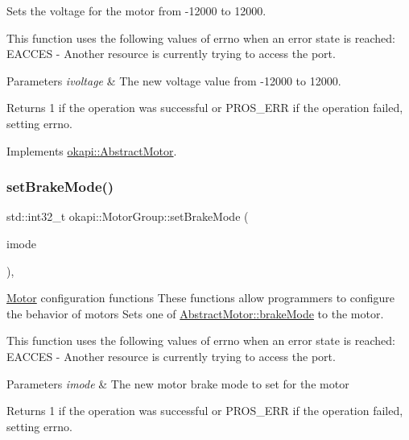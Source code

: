 Sets the voltage for the motor from -\/12000 to 12000.

This function uses the following values of errno when an error state is reached\+: E\+A\+C\+C\+ES -\/ Another resource is currently trying to access the port.


\begin{DoxyParams}{Parameters}
{\em ivoltage} & The new voltage value from -\/12000 to 12000. \\
\hline
\end{DoxyParams}
\begin{DoxyReturn}{Returns}
1 if the operation was successful or {\ttfamily P\+R\+O\+S\+\_\+\+E\+RR} if the operation failed, setting errno. 
\end{DoxyReturn}


Implements \mbox{\hyperlink{classokapi_1_1AbstractMotor_a15d12555f527109b046c65fe753d7e20}{okapi\+::\+Abstract\+Motor}}.

\mbox{\label{classokapi_1_1MotorGroup_a2124ee76893c401cd6dbf4879808349a}} 
\subsubsection{\texorpdfstring{setBrakeMode()}{setBrakeMode()}}
{\footnotesize\ttfamily std\+::int32\+\_\+t okapi\+::\+Motor\+Group\+::set\+Brake\+Mode (\begin{DoxyParamCaption}\item[{\mbox{\hyperlink{classokapi_1_1AbstractMotor_a132e0485dbb59a60c3f934338d8fa601}{Abstract\+Motor\+::brake\+Mode}}}]{imode }\end{DoxyParamCaption})\hspace{0.3cm}{\ttfamily [override]}, {\ttfamily [virtual]}}

\mbox{\hyperlink{classokapi_1_1Motor}{Motor}} configuration functions These functions allow programmers to configure the behavior of motors Sets one of \mbox{\hyperlink{classokapi_1_1AbstractMotor_a132e0485dbb59a60c3f934338d8fa601}{Abstract\+Motor\+::brake\+Mode}} to the motor.

This function uses the following values of errno when an error state is reached\+: E\+A\+C\+C\+ES -\/ Another resource is currently trying to access the port.


\begin{DoxyParams}{Parameters}
{\em imode} & The new motor brake mode to set for the motor \\
\hline
\end{DoxyParams}
\begin{DoxyReturn}{Returns}
1 if the operation was successful or {\ttfamily P\+R\+O\+S\+\_\+\+E\+RR} if the operation failed, setting errno. 
\end{DoxyReturn}


